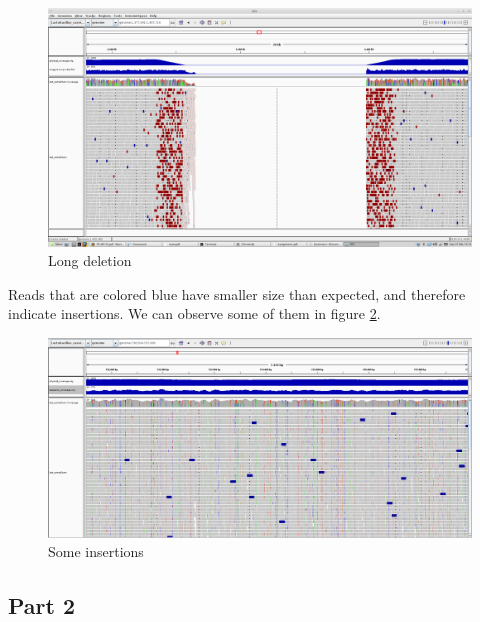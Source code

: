\begin{enumerate}
\begin{figure}[h]
  \centering
  \includegraphics[scale=0.2]{img/pairs}
  \caption{Long deletion}
  \label{fig:pairs}
\end{figure}

Reads that are colored blue have smaller size than expected, and therefore
indicate insertions. We can observe some of them in figure
\ref{fig:pairs2}.

\begin{figure}[h]
  \centering
  \includegraphics[scale=0.2]{img/pairs2}
  \caption{Some insertions}
  \label{fig:pairs2}
\end{figure}

\end{enumerate}

\newpage
\subsection{Part 2}

